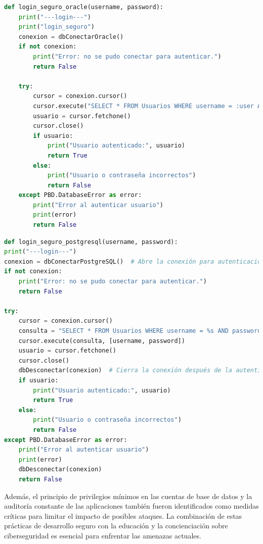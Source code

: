 \documentclass[a4paper,12pt]{article}
\begin{document}
\vspace{0,5cm}

\begin{lstlisting}[language=Python]
def login_seguro_oracle(username, password):
    print("---login---")
    print("login_seguro")
    conexion = dbConectarOracle()
    if not conexion:
        print("Error: no se pudo conectar para autenticar.")
        return False

    try:
        cursor = conexion.cursor()
        cursor.execute("SELECT * FROM Usuarios WHERE username = :user AND password = :pass", (username, password))
        usuario = cursor.fetchone()
        cursor.close()
        if usuario:
            print("Usuario autenticado:", usuario)
            return True
        else:
            print("Usuario o contraseña incorrectos")
            return False
    except PBD.DatabaseError as error:
        print("Error al autenticar usuario")
        print(error)
        return False
\end{lstlisting}

\vspace{0,5cm}

\begin{lstlisting}[language=Python]
def login_seguro_postgresql(username, password):
print("---login---")
conexion = dbConectarPostgreSQL()  # Abre la conexión para autenticación
if not conexion:
    print("Error: no se pudo conectar para autenticar.")
    return False

try:
    cursor = conexion.cursor()
    consulta = "SELECT * FROM Usuarios WHERE username = %s AND password = %s"
    cursor.execute(consulta, [username, password])
    usuario = cursor.fetchone()
    cursor.close()
    dbDesconectar(conexion)  # Cierra la conexión después de la autenticación
    if usuario:
        print("Usuario autenticado:", usuario)
        return True
    else:
        print("Usuario o contraseña incorrectos")
        return False
except PBD.DatabaseError as error:
    print("Error al autenticar usuario")
    print(error)
    dbDesconectar(conexion)
    return False
\end{lstlisting}

\vspace{0,5cm}



Además, el principio de privilegios mínimos en las cuentas de base de datos y la auditoría constante de las aplicaciones también fueron identificados como medidas críticas para limitar el impacto de posibles ataques. La combinación de estas prácticas de desarrollo seguro con la educación y la concienciación sobre ciberseguridad es esencial para enfrentar las amenazas actuales.
\end{document}
